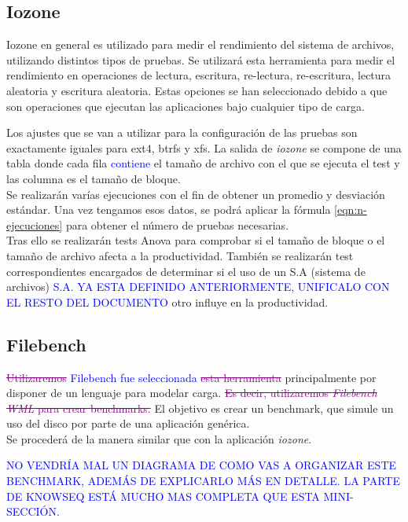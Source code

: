 \subsection{Iozone}\label{metodologia_iozone}
Iozone en general es utilizado para medir el rendimiento del sistema de archivos, utilizando distintos tipos de pruebas. Se utilizará esta herramienta para medir el rendimiento en operaciones de lectura, escritura, re-lectura, re-escritura, lectura aleatoria y escritura aleatoria. Estas opciones se han seleccionado debido a que son operaciones que ejecutan las aplicaciones bajo cualquier tipo de carga.

Los ajustes que se van a utilizar para la configuración de las pruebas son exactamente iguales para ext4, btrfs y xfs. La salida de \textit{iozone} se compone de una tabla donde cada fila \textcolor{blue}{contiene} el tamaño de archivo con el que se ejecuta el test y las columna es el tamaño de bloque. \\

Se realizarán varías ejecuciones con el fin de obtener un promedio y desviación estándar. Una vez tengamos esos datos, se podrá aplicar la fórmula \ref{eqn:n-ejecuciones} para obtener el número de pruebas necesarias.\\

Tras ello se realizarán tests Anova para comprobar si el tamaño de bloque o el tamaño de archivo afecta a la productividad. También se realizarán test correspondientes encargados de determinar si el uso de un S.A (sistema de archivos) \textcolor{blue}{S.A. YA ESTA DEFINIDO ANTERIORMENTE, UNIFICALO CON EL RESTO DEL DOCUMENTO} otro influye en la productividad.



\subsection{Filebench}
\textcolor{purple}{\sout{Utilizaremos}} \textcolor{blue}{Filebench fue seleccionada} \textcolor{purple}{\sout{esta herramienta}} principalmente por disponer de un lenguaje para modelar carga. \textcolor{purple}{\sout{Es decir, utilizaremos \textit{Filebench} \textit{WML} para crear benchmarks.}} El objetivo es crear un benchmark, que simule un uso del disco por parte de una aplicación genérica.\\

Se procederá de la manera similar que con la aplicación \textit{iozone}.

\textcolor{blue}{NO VENDRÍA MAL UN DIAGRAMA DE COMO VAS A ORGANIZAR ESTE BENCHMARK, ADEMÁS DE EXPLICARLO MÁS EN DETALLE. LA PARTE DE KNOWSEQ ESTÁ MUCHO MAS COMPLETA QUE ESTA MINI-SECCIÓN.}

